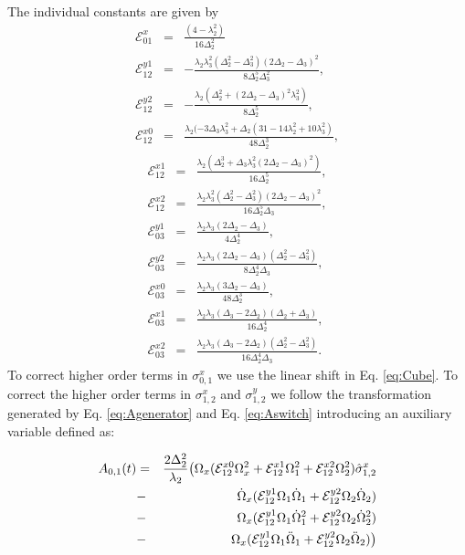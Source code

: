 \documentclass[superscriptaddress,amsmath,amssymb,aps,twocolumn,praplied,notitlepage]{revtex4-2}
\begin{document}
The individual constants are given by
\begin{eqnarray}
    \mathcal{E}^x_{01} &=& \frac{(4-\lambda_2^2)}{16\Delta_2^2} \\
    \mathcal{E}^{y1}_{12}&=&-\frac{\lambda_2\lambda_3^2(\Delta_2^2-\Delta_3^2)(2\Delta_2-\Delta_3)^2}{8\Delta_2^5\Delta_3^2}  ,\\
    \mathcal{E}^{y2}_{12}&=&-\frac{\lambda_2(\Delta_2^2+(2\Delta_2-\Delta_3)^2\lambda_3^2)}{8\Delta_2^5} ,\\
    \mathcal{E}^{x0}_{12}&=& \frac{\lambda_2(-3\Delta_3\lambda_3^2+\Delta_2(31-14\lambda_2^2+10\lambda_3^2)}{48\Delta_2^3} ,
    \end{eqnarray}
\begin{eqnarray}
    \mathcal{E}^{x1}_{12}&=& \frac{\lambda_2(\Delta_2^3+\Delta_3\lambda_3^2(2\Delta_2-\Delta_3)^2)}{16\Delta_2^5} ,\\
    \mathcal{E}^{x2}_{12}&=& \frac{\lambda_2\lambda_3^2(\Delta_2^2-\Delta_3^2)(2\Delta_2-\Delta_3)^2}{16\Delta_2^5\Delta_3},\\
    \mathcal{E}^{y1}_{03}&=& \frac{\lambda_2\lambda_3(2\Delta_2-\Delta_3)}{4\Delta_2^4} ,\\
    \mathcal{E}^{y2}_{03}&=&\frac{\lambda_2\lambda_3(2\Delta_2-\Delta_3)(\Delta_2^2-\Delta_3^2)}{8\Delta_2^4\Delta_3} ,\\
    \mathcal{E}^{x0}_{03}&=&\frac{\lambda_2\lambda_3(3\Delta_2-\Delta_3)}{48\Delta_2^3} ,\\
    \mathcal{E}^{x1}_{03}&=& \frac{\lambda_2\lambda_3(\Delta_3-2\Delta_2)(\Delta_2+\Delta_3)}{16\Delta_2^4},\\
    \mathcal{E}^{x2}_{03}&=& \frac{\lambda_2\lambda_3(\Delta_3-2\Delta_2)(\Delta_2^2-\Delta_3^2)}{16\Delta_2^4\Delta_3} .
\end{eqnarray}
 To correct higher order terms in $\sigma^x_{0,1}$ we use the linear shift in Eq. \ref{eq:Cube}. To correct the higher order terms in $\sigma^x_{1,2}$ and $\sigma^y_{1,2}$ we follow the transformation generated by Eq. \ref{eq:Agenerator} and Eq. \ref{eq:Aswitch} introducing an auxiliary variable defined as:

\begin{eqnarray}
A_{0,1}(t)&=&\nonumber\frac{2\Delta_2^2}{\lambda_2}\big{(}\Omega_x(\mathcal{E}^{x0}_{12}\Omega_x^2+\mathcal{E}^{x1}_{12}\Omega_1^2+\mathcal{E}^{x2}_{12}\Omega_2^2)\hat{\sigma}_{1,2}^x \\ \nonumber
&-& \dot{\Omega}_x(\mathcal{E}^{y1}_{12}\Omega_1\dot\Omega_1+\mathcal{E}^{y2}_{12}\Omega_2\dot\Omega_2) \\ \nonumber
&-&  \Omega_x(\mathcal{E}^{y1}_{12}\Omega_1\dot\Omega_1^2+\mathcal{E}^{y2}_{12}\Omega_2\dot\Omega_2^2) \\ 
&-& \Omega_x(\mathcal{E}^{y1}_{12}\Omega_1\ddot\Omega_1+\mathcal{E}^{y2}_{12}\Omega_2\ddot\Omega_2)\big{)}
\label{eq:Adef}
\end{eqnarray}
\end{document}
